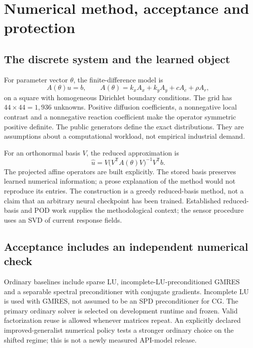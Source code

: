 \documentclass[11pt,letterpaper]{article}
\begin{document}
\section{Numerical method, acceptance and protection}

\subsection{The discrete system and the learned object}

For parameter vector $\theta$, the finite-difference model is
\begin{equation}
 A(\theta)u=b,\qquad A(\theta)=k_xA_x+k_yA_y+cA_c+\rho A_r,
 \label{eq:operator}
\end{equation}
on a square with homogeneous Dirichlet boundary conditions. The grid has $44\times44=1,936$ unknowns. Positive diffusion coefficients, a nonnegative local contrast and a nonnegative reaction coefficient make the operator symmetric positive definite. The public generators define the exact distributions. They are assumptions about a computational workload, not empirical industrial demand.

For an orthonormal basis $V$, the reduced approximation is
\begin{equation}
 \widehat u = V\bigl(V^{\mathsf T}A(\theta)V\bigr)^{-1}V^{\mathsf T}b.
 \label{eq:reduced}
\end{equation}
The projected affine operators are built explicitly. The stored basis preserves learned numerical information; a prose explanation of the method would not reproduce its entries. The construction is a greedy reduced-basis method, not a claim that an arbitrary neural checkpoint has been trained. Established reduced-basis and POD work supplies the methodological context; the sensor procedure uses an SVD of current response fields.\citep{rozza_2008,grassle_2020,hinze_kunkel_2010,manohar_2018}

\subsection{Acceptance includes an independent numerical check}

Ordinary baselines include sparse LU, incomplete-LU-preconditioned GMRES and a separable spectral preconditioner with conjugate gradients. Incomplete LU is used with GMRES, not assumed to be an SPD preconditioner for CG. The primary ordinary solver is selected on development runtime and frozen. Valid factorization reuse is allowed whenever matrices repeat. An explicitly declared improved-generalist numerical policy tests a stronger ordinary choice on the shifted regime; this is not a newly measured API-model release.\citep{scipy_cg_2026,scipy_splu_2026}
\end{document}
